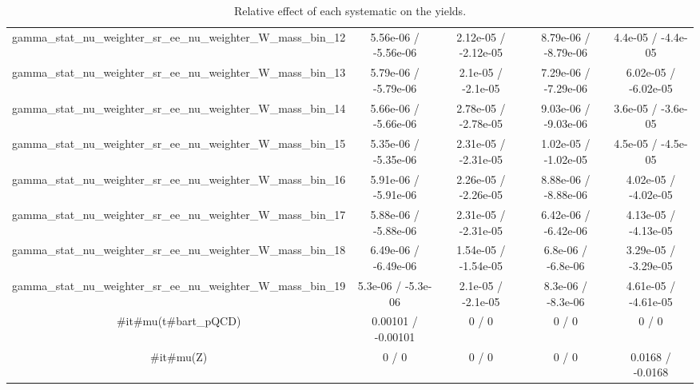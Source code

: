 \documentclass[10pt]{article}
\begin{document}
\begin{table}[htbp]
\begin{center}
\begin{tabular}{|c|c|c|c|c|}
  gamma_stat_nu_weighter_sr_ee_nu_weighter_W_mass_bin_12 & 5.56e-06 / -5.56e-06 & 2.12e-05 / -2.12e-05 & 8.79e-06 / -8.79e-06 & 4.4e-05 / -4.4e-05 \\ 
  gamma_stat_nu_weighter_sr_ee_nu_weighter_W_mass_bin_13 & 5.79e-06 / -5.79e-06 & 2.1e-05 / -2.1e-05 & 7.29e-06 / -7.29e-06 & 6.02e-05 / -6.02e-05 \\ 
  gamma_stat_nu_weighter_sr_ee_nu_weighter_W_mass_bin_14 & 5.66e-06 / -5.66e-06 & 2.78e-05 / -2.78e-05 & 9.03e-06 / -9.03e-06 & 3.6e-05 / -3.6e-05 \\ 
  gamma_stat_nu_weighter_sr_ee_nu_weighter_W_mass_bin_15 & 5.35e-06 / -5.35e-06 & 2.31e-05 / -2.31e-05 & 1.02e-05 / -1.02e-05 & 4.5e-05 / -4.5e-05 \\ 
  gamma_stat_nu_weighter_sr_ee_nu_weighter_W_mass_bin_16 & 5.91e-06 / -5.91e-06 & 2.26e-05 / -2.26e-05 & 8.88e-06 / -8.88e-06 & 4.02e-05 / -4.02e-05 \\ 
  gamma_stat_nu_weighter_sr_ee_nu_weighter_W_mass_bin_17 & 5.88e-06 / -5.88e-06 & 2.31e-05 / -2.31e-05 & 6.42e-06 / -6.42e-06 & 4.13e-05 / -4.13e-05 \\ 
  gamma_stat_nu_weighter_sr_ee_nu_weighter_W_mass_bin_18 & 6.49e-06 / -6.49e-06 & 1.54e-05 / -1.54e-05 & 6.8e-06 / -6.8e-06 & 3.29e-05 / -3.29e-05 \\ 
  gamma_stat_nu_weighter_sr_ee_nu_weighter_W_mass_bin_19 & 5.3e-06 / -5.3e-06 & 2.1e-05 / -2.1e-05 & 8.3e-06 / -8.3e-06 & 4.61e-05 / -4.61e-05 \\ 
  #it{#mu}(t#bar{t}_{pQCD}) & 0.00101 / -0.00101 & 0 / 0 & 0 / 0 & 0 / 0 \\ 
  #it{#mu}(Z) & 0 / 0 & 0 / 0 & 0 / 0 & 0.0168 / -0.0168 \\ 
\hline 
\end{tabular} 
\caption{Relative effect of each systematic on the yields.} 
\end{center} 
\end{table} 
\end{document}
